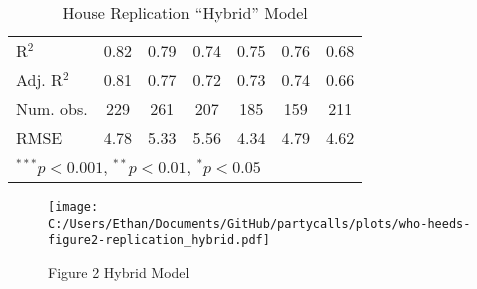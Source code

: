 \documentclass[12pt]{article}
\begin{document}
\begin{table}
\begin{center}
\begin{tabular}{l c c c c c c }
			\hline
			R$^2$                       & 0.82          & 0.79          & 0.74           & 0.75           & 0.76           & 0.68           \\
			Adj. R$^2$                  & 0.81          & 0.77          & 0.72           & 0.73           & 0.74           & 0.66           \\
			Num. obs.                   & 229           & 261           & 207            & 185            & 159            & 211            \\
			RMSE                        & 4.78          & 5.33          & 5.56           & 4.34           & 4.79           & 4.62           \\
			\hline
			\multicolumn{7}{l}{\scriptsize{$^{***}p<0.001$, $^{**}p<0.01$, $^*p<0.05$}}
		\end{tabular}
		\caption{House Replication ``Hybrid'' Model}
		\label{table:hybrid coefficients}
	\end{center}
\end{table}

\begin{figure}[h]
	\caption{Figure 2 Hybrid Model}
	\centering
	\texttt{[image: C:/Users/Ethan/Documents/GitHub/partycalls/plots/who-heeds-figure2-replication\_hybrid.pdf]}
	
\end{figure}
\end{document}
